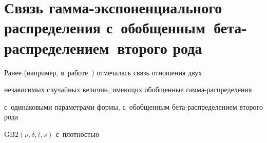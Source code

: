 \section{Связь гамма-экспоненциального распределения с~обобщенным~бета-распределением~второго рода}





Ранее (например, в~работе~\cite{Ku2019_1}) отмечалась связь отношения двух 


независимых случайных величин, име\-ющих обобщенные гам\-ма-рас\-пре\-де\-ле\-ния 


с~одинаковыми па\-ра\-мет\-ра\-ми формы, с~обобщенным бе\-та-рас\-пре\-де\-ле\-ни\-ем второго рода 


$\mathrm{GB2}(\nu,\delta,t,s)$ \cite{McDonald1984} с~плот\-ностью





